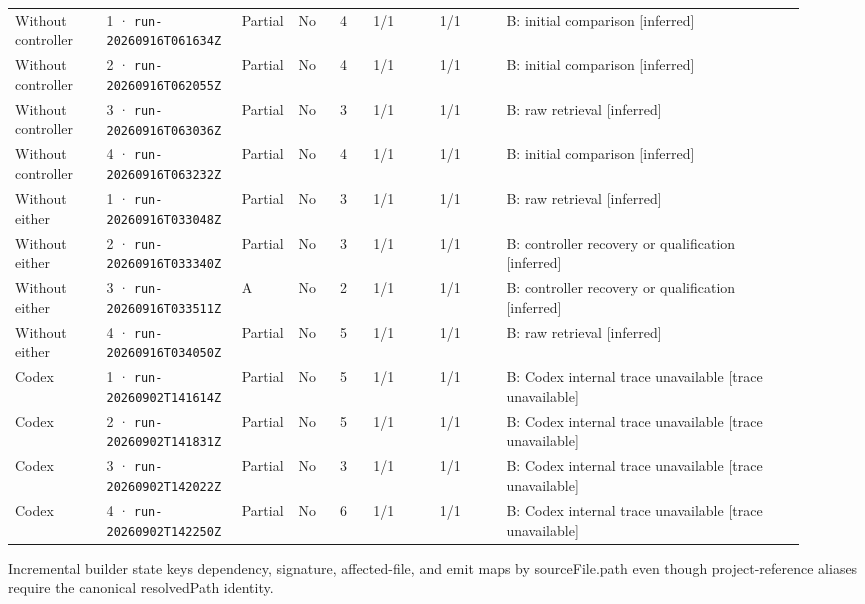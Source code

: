 \begin{landscape}
\begin{longtable}{@{}L{0.11\linewidth}L{0.16\linewidth}*{1}{L{0.022\linewidth}}L{0.05\linewidth}L{0.045\linewidth}L{0.08\linewidth}L{0.085\linewidth}L{0.368\linewidth}@{}}
Without controller & 1 · \texttt{run-20260916\allowbreak T061634Z} & Partial & No & 4 & 1/1 & 1/1 & B: initial comparison [inferred] \\
Without controller & 2 · \texttt{run-20260916\allowbreak T062055Z} & Partial & No & 4 & 1/1 & 1/1 & B: initial comparison [inferred] \\
Without controller & 3 · \texttt{run-20260916\allowbreak T063036Z} & Partial & No & 3 & 1/1 & 1/1 & B: raw retrieval [inferred] \\
Without controller & 4 · \texttt{run-20260916\allowbreak T063232Z} & Partial & No & 4 & 1/1 & 1/1 & B: initial comparison [inferred] \\
Without either & 1 · \texttt{run-20260916\allowbreak T033048Z} & Partial & No & 3 & 1/1 & 1/1 & B: raw retrieval [inferred] \\
Without either & 2 · \texttt{run-20260916\allowbreak T033340Z} & Partial & No & 3 & 1/1 & 1/1 & B: controller recovery or qualification [inferred] \\
Without either & 3 · \texttt{run-20260916\allowbreak T033511Z} & A & No & 2 & 1/1 & 1/1 & B: controller recovery or qualification [inferred] \\
Without either & 4 · \texttt{run-20260916\allowbreak T034050Z} & Partial & No & 5 & 1/1 & 1/1 & B: raw retrieval [inferred] \\
Codex & 1 · \texttt{run-20260902\allowbreak T141614Z} & Partial & No & 5 & 1/1 & 1/1 & B: Codex internal trace unavailable [trace unavailable] \\
Codex & 2 · \texttt{run-20260902\allowbreak T141831Z} & Partial & No & 5 & 1/1 & 1/1 & B: Codex internal trace unavailable [trace unavailable] \\
Codex & 3 · \texttt{run-20260902\allowbreak T142022Z} & Partial & No & 3 & 1/1 & 1/1 & B: Codex internal trace unavailable [trace unavailable] \\
Codex & 4 · \texttt{run-20260902\allowbreak T142250Z} & Partial & No & 6 & 1/1 & 1/1 & B: Codex internal trace unavailable [trace unavailable] \\
\end{longtable}
\endgroup
\end{landscape}

\label{sec:microsoft-typescript-35468}

Incremental builder state keys dependency, signature, affected-file, and emit maps by sourceFile.path even though project-reference aliases require the canonical resolvedPath identity.

